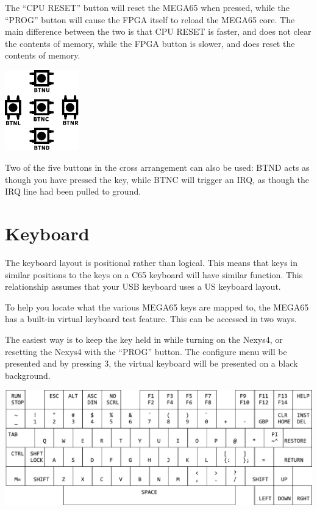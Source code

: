 The ``CPU RESET'' button will reset the MEGA65 when pressed, while the ``PROG'' button will cause the FPGA itself to reload the MEGA65
core.  The main difference between the two is that CPU RESET is faster, and does not clear the contents of memory, while the FPGA button
is slower, and does reset the contents of memory.

\begin{center}
  \includegraphics[width=3.2cm]{images/illustrations/nexys-five-buttons.pdf}
\end{center}

Two of the five buttons in the cross arrangement can also be used:  BTND acts as though you have pressed the  key, while BTNC will trigger an IRQ, as though the IRQ line had been pulled to ground.

\section{Keyboard}

The keyboard layout is positional rather than logical.
This means that keys in similar positions to the keys on a C65 keyboard will have similar function.
This relationship assumes that your USB keyboard uses a US keyboard layout.

To help you locate what the various MEGA65 keys are mapped to, the MEGA65 has a built-in virtual keyboard test feature. This can be accessed in two ways.

The easiest way is to keep the  key held in while turning on the Nexys4, or resetting the Nexys4 with the ``PROG'' button. The configure menu will be presented and by pressing 3, the virtual keyboard will be presented on a black background.

\includegraphics[width=\linewidth]{images/illustrations/virtual-keyboard.pdf}

